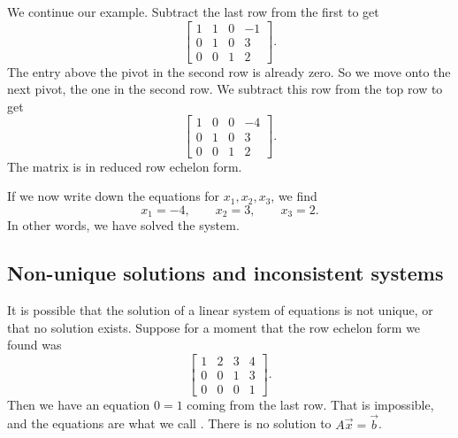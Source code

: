 We continue our example.
Subtract the last row from the first to get
\begin{equation*}
\left[
\begin{array}{ccc|c}
1 & 1 & 0 & -1 \\
0 & 1 & 0 & 3 \\
0 & 0 & 1 & 2
\end{array}
\right] .
\end{equation*}
The entry above the pivot in the second row is already zero.
So we move onto the next pivot, the one in the second row.  We subtract
this row from the top row to get
\begin{equation*}
\left[
\begin{array}{ccc|c}
1 & 0 & 0 & -4 \\
0 & 1 & 0 & 3 \\
0 & 0 & 1 & 2
\end{array}
\right] .
\end{equation*}
The matrix is in reduced row echelon form.

If we now write down the equations for $x_1,x_2,x_3$, we find
\begin{equation*}
x_1 = -4, \qquad x_2 = 3, \qquad x_3 = 2 .
\end{equation*}
In other words, we have solved the system.

\subsection{Non-unique solutions and inconsistent systems}

It is
possible that the solution of a linear system of equations
is not unique, or that no solution exists.  Suppose for a moment
that the row echelon form we found was
\begin{equation*}
\left[
\begin{array}{ccc|c}
1 & 2 & 3 & 4 \\
0 & 0 & 1 & 3 \\
0 & 0 & 0 & 1
\end{array}
\right] .
\end{equation*}
Then we have an equation $0=1$ coming from the last row.  That is
impossible,
and the equations are what we call \emph{}.  There is no solution
to $A \vec{x} = \vec{b}$.


